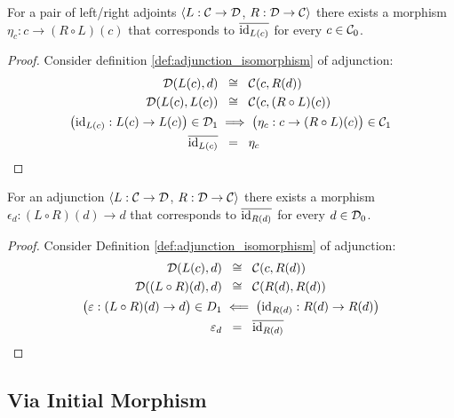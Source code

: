 \begin{theorem}
  For a pair of left/right adjoints $\langle L: \mathcal{C} \to \mathcal{D}$, $R:\mathcal{D}\to \mathcal{C}\rangle$
  there exists a morphism $\eta_c: c\to (R\circ L)(c)$ that corresponds to
  $\overline{\mathrm{id}_{L(c)}}$ for every $c\in \mathcal{C}_0$.

  \begin{proof}
    Consider definition \ref{def:adjunction_isomorphism} of adjunction:
    \[
      \begin{aligned}
        \mathcal{D}(L(c), d) &\ \:\cong\ \: \mathcal{C}(c, R(d))\\
        \mathcal{D}(L(c), L(c)) &\ \:\cong\ \: \mathcal{C}(c, (R\circ L)(c))\\
        \big(\mathrm{id}_{L(c)}: L(c) \to L(c)\big) \in \mathcal{D}_1
        &\implies \big(\eta_c : c \to (R\circ L)(c)\big)\in \mathcal{C}_1\\
        \overline{\mathrm{id}_{L(c)}} &\ \:=\ \:\eta_c
      \end{aligned}
    \]
  \end{proof}
\end{theorem}

\begin{theorem}
  For an adjunction $\langle L: \mathcal{C} \to \mathcal{D}$, $R:\mathcal{D}\to \mathcal{C}\rangle$
  there exists a morphism $\epsilon_d: (L\circ R)(d)\to d$ that corresponds to
  $\overline{\mathrm{id}_{R(d)}}$ for every $d\in \mathcal{D}_0$.

  \begin{proof}
    Consider Definition \ref{def:adjunction_isomorphism} of adjunction:
    \[
      \begin{aligned}
        \mathcal{D}(L(c), d) &\ \:\cong\ \: \mathcal{C}(c, R(d))\\
        \mathcal{D}((L\circ R)(d), d) &\ \:\cong\ \: \mathcal{C}(R(d), R(d))\\
        \big(\varepsilon:(L\circ R)(d)\to d\big)\in D_1 &\impliedby
          \big(\mathrm{id}_{R(d)}: R(d) \to R(d)\big)\\
        \varepsilon_d &\ \:=\ \:\overline{\mathrm{id}_{R(d)}}
      \end{aligned}
    \]
  \end{proof}
\end{theorem}

\subsection{Via Initial Morphism}

